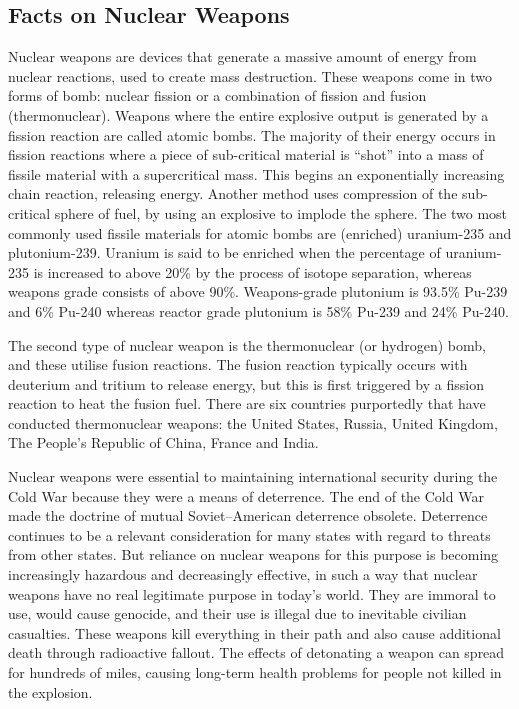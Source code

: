\documentclass[twoside,titlepage,11pt,twocolumn,a4paper]{article}
\begin{document}
\subsection{Facts on Nuclear Weapons}
Nuclear weapons are devices that generate a massive amount of energy
from nuclear reactions, used to create mass destruction. These weapons
come in two forms of bomb: nuclear fission or a combination of fission
and fusion (thermonuclear). Weapons where the entire explosive output
is generated by a fission reaction are called atomic bombs. The
majority of their energy occurs in fission reactions where a piece of
sub-critical material is ``shot'' into a mass of fissile material with
a supercritical mass. This begins an exponentially increasing chain
reaction, releasing energy. Another method uses compression of the
sub-critical sphere of fuel, by using an explosive to implode the
sphere. The two most commonly used fissile materials for atomic bombs
are (enriched) uranium-235 and plutonium-239. Uranium is said to be
enriched when the percentage of uranium-235 is increased to above 20\%
by the process of isotope separation, whereas weapons grade consists
of above 90\%. \citep{blackmarket} Weapons-grade plutonium is 93.5\%
Pu-239 and 6\% Pu-240 whereas reactor grade plutonium is 58\% Pu-239
and 24\% Pu-240.  \citep{drell1993}

The second type of nuclear weapon is the thermonuclear (or hydrogen)
bomb, and these utilise fusion reactions.  The fusion reaction
typically occurs with deuterium and tritium to release energy, but
this is first triggered by a fission reaction to heat the fusion
fuel. There are six countries purportedly that have conducted
thermonuclear weapons: the United States, Russia, United Kingdom, The
People's Republic of China, France and India.

Nuclear weapons were essential to maintaining international security
during the Cold War because they were a means of deterrence. The end
of the Cold War made the doctrine of mutual Soviet--American
deterrence obsolete. Deterrence continues to be a relevant
consideration for many states with regard to threats from other
states. But reliance on nuclear weapons for this purpose is becoming
increasingly hazardous and decreasingly effective, in such a way that
nuclear weapons have no real legitimate purpose in today’s world. They
are immoral to use, would cause genocide, and their use is illegal due
to inevitable civilian casualties. These weapons kill everything in
their path and also cause additional death through radioactive
fallout. The effects of detonating a weapon can spread for hundreds of
miles, causing long-term health problems for people not killed in the
explosion.
\end{document}
